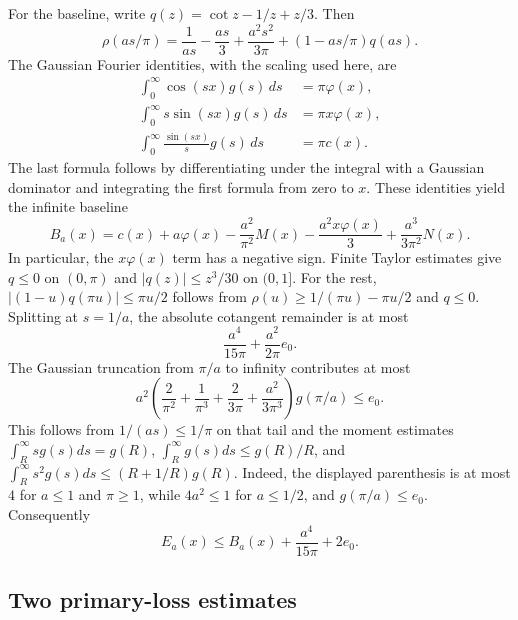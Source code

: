 \documentclass[11pt]{article}
\newcommand{\ph}{\varphi}
\newcommand{\ep}{e_0}
\begin{document}
For the baseline, write $q(z)=\cot z-1/z+z/3$. Then
\[
 \rho(as/\pi)=\frac1{as}-\frac{as}3+\frac{a^2s^2}{3\pi}
                 +(1-as/\pi)q(as).
\]
The Gaussian Fourier identities, with the scaling used here, are
\begin{align*}
 \int_0^\infty\cos(sx)g(s)\,ds&=\pi\ph(x),\\
 \int_0^\infty s\sin(sx)g(s)\,ds&=\pi x\ph(x),\\
 \int_0^\infty\frac{\sin(sx)}s g(s)\,ds&=\pi c(x).
\end{align*}
The last formula follows by differentiating under the integral with a
Gaussian dominator and integrating the first formula from zero to $x$.
These identities yield the infinite baseline
\begin{equation}\label{eq:baseline}
 B_a(x)=c(x)+a\ph(x)-\frac{a^2}{\pi^2}M(x)
          -\frac{a^2x\ph(x)}3+\frac{a^3}{3\pi^2}N(x).
\end{equation}
In particular, the $x\ph(x)$ term has a negative sign.
Finite Taylor estimates give $q\le0$ on $(0,\pi)$ and
$|q(z)|\le z^3/30$ on $(0,1]$.
For the rest, $|(1-u)q(\pi u)|\le\pi u/2$ follows from
$\rho(u)\ge1/(\pi u)-\pi u/2$ and $q\le0$.
Splitting at $s=1/a$, the absolute cotangent remainder is at most
\[
 \frac{a^4}{15\pi}+\frac{a^2}{2\pi}\ep.
\]
The Gaussian truncation from $\pi/a$ to infinity contributes at most
\[
 a^2\left(\frac2{\pi^2}+\frac1{\pi^3}
                +\frac2{3\pi}+\frac{a^2}{3\pi^3}\right)g(\pi/a)
 \le \ep.
\]
This follows from $1/(as)\le1/\pi$ on that tail and the moment estimates
$\int_R^\infty sg(s)ds=g(R)$,
$\int_R^\infty g(s)ds\le g(R)/R$, and
$\int_R^\infty s^2g(s)ds\le(R+1/R)g(R)$.
Indeed, the displayed parenthesis is at most $4$ for $a\le1$ and
$\pi\ge1$, while $4a^2\le1$ for $a\le1/2$, and $g(\pi/a)\le\ep$.
Consequently
\begin{equation}\label{eq:Ebound}
 E_a(x)\le B_a(x)+\frac{a^4}{15\pi}+2\ep.
\end{equation}

\subsection{Two primary-loss estimates}
\end{document}
